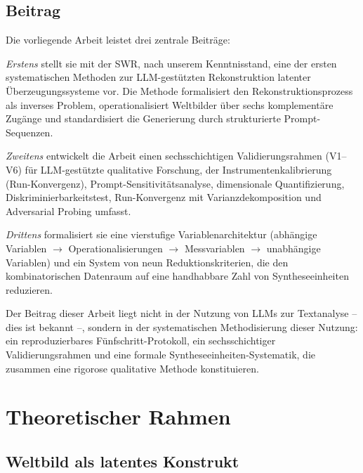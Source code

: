 \documentclass[11pt,a4paper]{article}
\theoremstyle{definition}
\theoremstyle{plain}
\theoremstyle{remark}
\begin{document}
\subsection{Beitrag}
\label{sec:beitrag}

Die vorliegende Arbeit leistet drei zentrale Beitr\"age:

\emph{Erstens} stellt sie mit der SWR, nach unserem Kenntnisstand, eine der ersten systematischen Methoden zur LLM-gest\"utzten Rekonstruktion latenter \"Uberzeugungssysteme vor. Die Methode formalisiert den Rekonstruktionsprozess als inverses Problem, operationalisiert Weltbilder \"uber sechs komplement\"are Zug\"ange und standardisiert die Generierung durch strukturierte Prompt-Sequenzen.

\emph{Zweitens} entwickelt die Arbeit einen sechsschichtigen Validierungsrahmen (V1--V6) f\"ur LLM-gest\"utzte qualitative Forschung, der Instrumentenkalibrierung (Run-Konvergenz), Prompt-Sensitivit\"atsanalyse, dimensionale Quantifizierung, Diskriminierbarkeitstest, Run-Konvergenz mit Varianzdekomposition und Adversarial Probing umfasst.

\emph{Drittens} formalisiert sie eine vierstufige Variablenarchitektur (abh\"angige Variablen $\rightarrow$ Operationalisierungen $\rightarrow$ Messvariablen $\rightarrow$ unabh\"angige Variablen) und ein System von neun Reduktionskriterien, die den kombinatorischen Datenraum auf eine handhabbare Zahl von Syntheseeinheiten reduzieren.

Der Beitrag dieser Arbeit liegt nicht in der Nutzung von LLMs zur Textanalyse -- dies ist bekannt --, sondern in der systematischen Methodisierung dieser Nutzung: ein reproduzierbares F\"unfschritt-Protokoll, ein sechsschichtiger Validierungsrahmen und eine formale Syntheseeinheiten-Systematik, die zusammen eine rigorose qualitative Methode konstituieren.



\section{Theoretischer Rahmen}
\label{sec:theorie}

\subsection{Weltbild als latentes Konstrukt}
\label{sec:weltbild}
\end{document}
